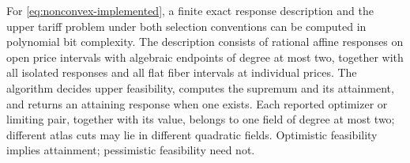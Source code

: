 \begin{theorem}
\label{thm:nonconvex-atlas}
For \eqref{eq:nonconvex-implemented}, a finite exact response description and
the upper tariff problem under both selection conventions can be computed
in polynomial bit complexity.
The description consists of rational affine responses on open price intervals
with algebraic endpoints of degree at most two, together with all isolated
responses and all flat fiber intervals at individual prices. The algorithm
decides upper feasibility, computes the supremum and its attainment, and
returns an attaining response when one exists. Each reported optimizer or
limiting pair, together with its value, belongs to one field of degree at most
two; different atlas cuts may lie in different quadratic fields. Optimistic
feasibility implies attainment; pessimistic feasibility need not.
\end{theorem}
